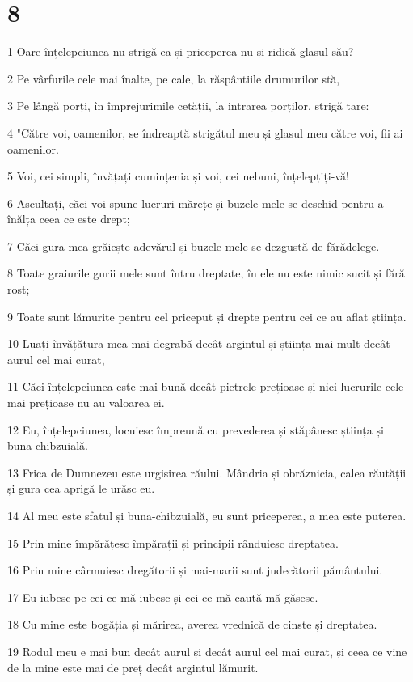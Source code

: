 \chapter{8}

\par 1 Oare înțelepciunea nu strigă ea și priceperea nu-și ridică glasul său?
\par 2 Pe vârfurile cele mai înalte, pe cale, la răspântiile drumurilor stă,
\par 3 Pe lângă porți, în împrejurimile cetății, la intrarea porților, strigă tare:
\par 4 "Către voi, oamenilor, se îndreaptă strigătul meu și glasul meu către voi, fii ai oamenilor.
\par 5 Voi, cei simpli, învățați cumințenia și voi, cei nebuni, înțelepțiți-vă!
\par 6 Ascultați, căci voi spune lucruri mărețe și buzele mele se deschid pentru a înălța ceea ce este drept;
\par 7 Căci gura mea grăiește adevărul și buzele mele se dezgustă de fărădelege.
\par 8 Toate graiurile gurii mele sunt întru dreptate, în ele nu este nimic sucit și fără rost;
\par 9 Toate sunt lămurite pentru cel priceput și drepte pentru cei ce au aflat știința.
\par 10 Luați învățătura mea mai degrabă decât argintul și știința mai mult decât aurul cel mai curat,
\par 11 Căci înțelepciunea este mai bună decât pietrele prețioase și nici lucrurile cele mai prețioase nu au valoarea ei.
\par 12 Eu, înțelepciunea, locuiesc împreună cu prevederea și stăpânesc știința și buna-chibzuială.
\par 13 Frica de Dumnezeu este urgisirea răului. Mândria și obrăznicia, calea răutății și gura cea aprigă le urăsc eu.
\par 14 Al meu este sfatul și buna-chibzuială, eu sunt priceperea, a mea este puterea.
\par 15 Prin mine împărățesc împărații și principii rânduiesc dreptatea.
\par 16 Prin mine cârmuiesc dregătorii și mai-marii sunt judecătorii pământului.
\par 17 Eu iubesc pe cei ce mă iubesc și cei ce mă caută mă găsesc.
\par 18 Cu mine este bogăția și mărirea, averea vrednică de cinste și dreptatea.
\par 19 Rodul meu e mai bun decât aurul și decât aurul cel mai curat, și ceea ce vine de la mine este mai de preț decât argintul lămurit.
